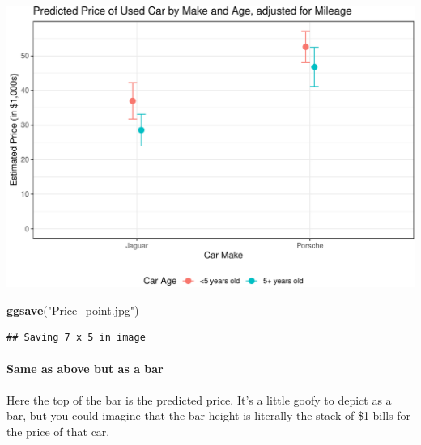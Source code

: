 \documentclass[]{article}
\newenvironment{Shaded}{\begin{snugshade}}{\end{snugshade}}
\newcommand{\KeywordTok}[1]{\textcolor[rgb]{0.13,0.29,0.53}{\textbf{#1}}}
\newcommand{\NormalTok}[1]{#1}
\newcommand{\StringTok}[1]{\textcolor[rgb]{0.31,0.60,0.02}{#1}}
\let\oldparagraph\paragraph
\renewcommand{\paragraph}[1]{\oldparagraph{#1}\mbox{}}
\begin{document}
\includegraphics{Visualization_Examples_2020_v01_files/figure-latex/unnamed-chunk-14-1.pdf}

\begin{Shaded}
\begin{Highlighting}[]
\KeywordTok{ggsave}\NormalTok{(}\StringTok{"Price_point.jpg"}\NormalTok{)}
\end{Highlighting}
\end{Shaded}

\begin{verbatim}
## Saving 7 x 5 in image
\end{verbatim}

\hypertarget{same-as-above-but-as-a-bar}{%
\paragraph{Same as above but as a
bar}\label{same-as-above-but-as-a-bar}}

Here the top of the bar is the predicted price. It's a little goofy to
depict as a bar, but you could imagine that the bar height is literally
the stack of \$1 bills for the price of that car.
\end{document}
